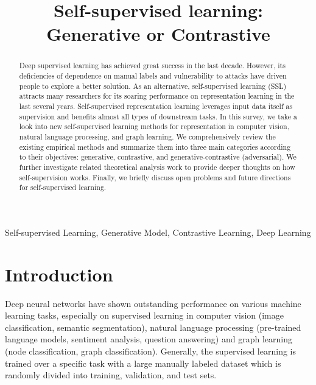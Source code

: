 \documentclass[conference]{IEEEtran}
\begin{document}
\title{Self-supervised learning: Generative or Contrastive
}

\author{

}

\maketitle

\begin{abstract}
Deep supervised learning has achieved great success in the last decade.
However, its deficiencies of dependence on manual labels and vulnerability
to attacks have driven people to explore a better solution.
As an alternative, self-supervised learning (SSL) attracts many researchers
for its soaring performance on representation learning in the last several years.
Self-supervised representation learning leverages input data itself as
supervision and benefits almost all types of downstream tasks.
In this survey, we take a look into new self-supervised learning methods for 
representation in computer vision, natural language processing, and 
graph learning. We comprehensively review the existing empirical methods and 
summarize them into three main categories according to their objectives:
generative, contrastive, and generative-contrastive (adversarial).
We further investigate related theoretical analysis work to provide deeper 
thoughts on how self-supervision works.
Finally, we briefly discuss open problems and future directions for self-supervised 
learning.
\end{abstract}

\begin{IEEEkeywords}
Self-supervised Learning, Generative Model, Contrastive Learning, Deep Learning
\end{IEEEkeywords}

\section{Introduction}
Deep neural networks \cite{b1} have shown outstanding performance 
on various machine learning tasks, especially on supervised learning 
in computer vision (image classification, semantic segmentation),
natural language processing (pre-trained language models, sentiment
analysis, question answering) and graph learning (node classification,
graph classification).
Generally, the supervised learning is trained over a specific
task with a large manually labeled dataset which is randomly divided
into training, validation, and test sets.
\end{document}
